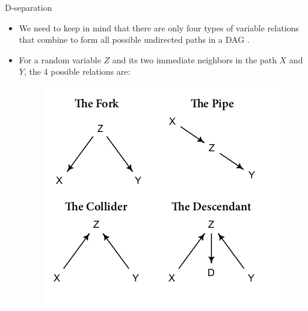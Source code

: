 \documentclass[handout]{beamer}
\begin{document}
\begin{frame}{D-separation}
\scriptsize{
\begin{itemize}

\item We need to keep in mind that there are only four types of variable relations that combine to form all possible undirected paths in a DAG \cite{mcelreath2020statistical}.

\item For a random variable $Z$ and its two immediate neighbors in the path $X$ and $Y$, the 4 possible relations are:

  \begin{figure}[h!]
	\centering
	\includegraphics[scale=0.6]{pics/collider.png}
	\end{figure} 


 
 
\end{itemize}



} 

\end{frame}
\end{document}
